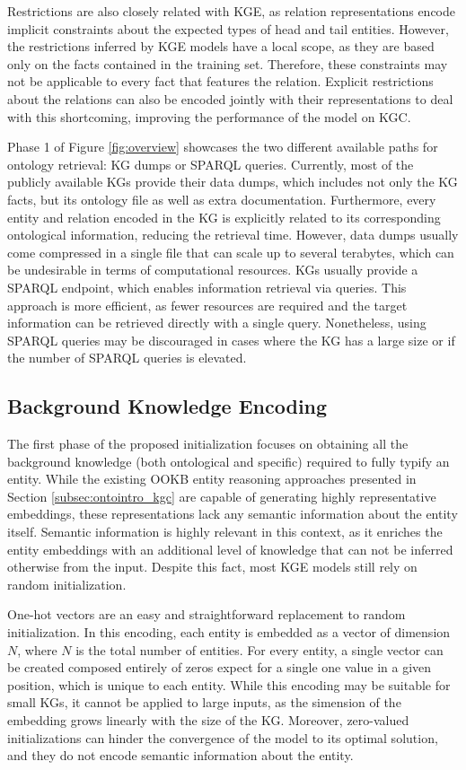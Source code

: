 Restrictions are also closely related with KGE, as relation representations encode implicit constraints about the expected types of head and tail entities. However, the restrictions inferred by KGE models have a local scope, as they are based only on the facts contained in the training set. Therefore, these constraints may not be applicable to every fact that features the relation. Explicit restrictions about the relations can also be encoded jointly with their representations to deal with this shortcoming, improving the performance of the model on KGC.

Phase 1 of Figure \ref{fig:overview} showcases the two different available paths for ontology retrieval: KG dumps or SPARQL queries. Currently, most of the publicly available KGs provide their data dumps, which includes not only the KG facts, but its ontology file as well as extra documentation. Furthermore, every entity and relation encoded in the KG is explicitly related to its corresponding ontological information, reducing the retrieval time. However, data dumps usually come compressed in a single file that can scale up to several terabytes, which can be undesirable in terms of computational resources. KGs usually provide a SPARQL endpoint, which enables information retrieval via queries. This approach is more efficient, as fewer resources are required and the target information can be retrieved directly with a single query. Nonetheless, using SPARQL queries may be discouraged in cases where the KG has a large size or if the number of SPARQL queries is elevated. 

\subsection{Background Knowledge Encoding}
The first phase of the proposed initialization focuses on obtaining all the background knowledge (both ontological and specific) required to fully typify an entity. While the existing OOKB entity reasoning approaches presented in Section \ref{subsec:ontointro_kgc} are capable of generating highly representative embeddings, these representations lack any semantic information about the entity itself. Semantic information is highly relevant in this context, as it enriches the entity embeddings with an additional level of knowledge that can not be inferred otherwise from the input. Despite this fact, most KGE models still rely on random initialization. 

One-hot vectors are an easy and straightforward replacement to random initialization. In this encoding, each entity is embedded as a vector of dimension $N$, where $N$ is the total number of entities. For every entity, a single vector can be created composed entirely of zeros expect for a single one value in a given position, which is unique to each entity. While this encoding may be suitable for small KGs, it cannot be applied to large inputs, as the simension of the embedding grows linearly with the size of the KG. Moreover, zero-valued initializations can hinder the convergence of the model to its optimal solution, and they do not encode semantic information about the entity.

